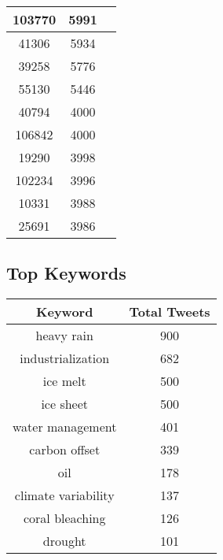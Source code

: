 \documentclass{article}\usepackage[T1]{fontenc}
\begin{document}
\begin{tabular}{|c|c|c|}
 \hline
103770 & 5991\\ 
 \hline
41306 & 5934\\ 
 \hline
39258 & 5776\\ 
 \hline
55130 & 5446\\ 
 \hline
40794 & 4000\\ 
 \hline
106842 & 4000\\ 
 \hline
19290 & 3998\\ 
 \hline
102234 & 3996\\ 
 \hline
10331 & 3988\\ 
 \hline
25691 & 3986\\ 
 \hline
\end{tabular}\subsection*{Top Keywords}\begin{tabular}{|c|c|}         \hline         Keyword & Total Tweets \\ 
 \hline
heavy rain & 900\\ 
 \hline
industrialization & 682\\ 
 \hline
ice melt & 500\\ 
 \hline
ice sheet & 500\\ 
 \hline
water management & 401\\ 
 \hline
carbon offset & 339\\ 
 \hline
oil & 178\\ 
 \hline
climate variability & 137\\ 
 \hline
coral bleaching & 126\\ 
 \hline
drought & 101\\ 
 \hline
\end{tabular}
\end{document}
